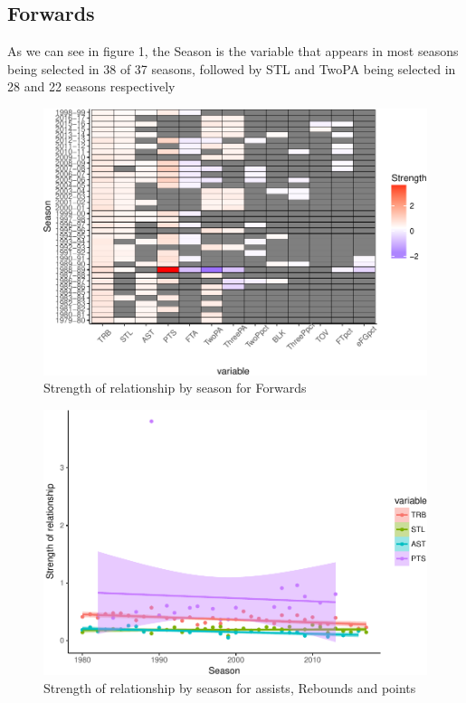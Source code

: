 \documentclass[]{elsarticle} %
\makeatletter
\def\maxwidth{\ifdim\Gin@nat@width>\linewidth\linewidth
\else\Gin@nat@width\fi}
\let\Oldincludegraphics\includegraphics
\renewcommand{\includegraphics}[1]{\Oldincludegraphics[width=\maxwidth]{#1}}
\makeatother
\begin{document}
\subsection{Forwards}\label{forwards}

As we can see in figure 1, the Season is the variable that appears in
most seasons being selected in 38 of 37 seasons, followed by STL and
TwoPA being selected in 28 and 22 seasons respectively

\begin{figure}[htbp]
\centering
\includegraphics{Coaching_Selection_files/figure-latex/unnamed-chunk-9-1.pdf}
\caption{Strength of relationship by season for Forwards}
\end{figure}

\begin{figure}[htbp]
\centering
\includegraphics{Coaching_Selection_files/figure-latex/unnamed-chunk-10-1.pdf}
\caption{Strength of relationship by season for assists, Rebounds and
points}
\end{figure}
\end{document}
